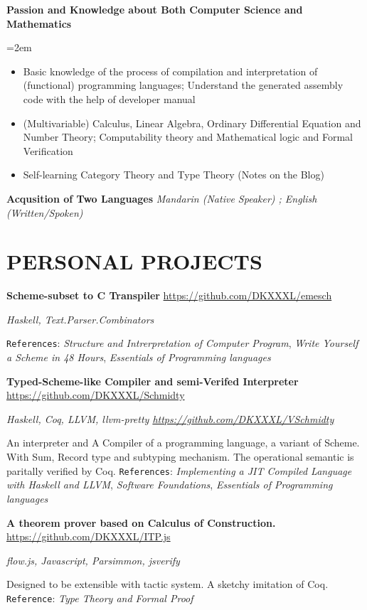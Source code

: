 \documentclass[fontsize=11pt]{article}
\newcommand{\NewPart}[1]{\section*{\uppercase{#1}}}
\newcommand{\SkillEntry}[2]{       %
    \noindent \textbf{#1} \hfill      %
        \noindent \textit{#2} \par        %
}
\newcommand{\SkillsEntry}[4]{       %
    \noindent \textbf{#1} \hfill      %
        \noindent \textit{#2} \par        %
    \noindent\hangindent=2em\hangafter=0 \small #4 %
    \normalsize \par}
\newcommand{\EducationEntry}[4]{
    \noindent \textbf{#1} \hfill      %
    \colorbox{Black}{ 
      \parbox{11em}{
      \centering \color{White}#2}} \par  %
    \noindent \textit{#3} \par        %
    \noindent\hangindent=0em\hangafter=0 \small #4 %
    \normalsize \par}
\newcommand{\ProjectEntry}[4]{         %
    \noindent \textbf{#1}  \hfill {#2} \par
    \noindent \textit{#3} \par
    \noindent \small #4 %
    \normalsize \par}
\begin{document}
\SkillsEntry{Passion and Knowledge about Both Computer Science and Mathematics}{}{}{
    \begin{itemize} \itemsep -1pt
        \item Basic knowledge of the process of compilation and interpretation of (functional) programming languages;
        Understand the generated assembly code with the help of developer manual
        \item (Multivariable) Calculus, Linear Algebra, Ordinary Differential Equation and Number Theory; 
        Computability theory and Mathematical logic and Formal Verification
        \item Self-learning Category Theory and Type Theory (Notes on the Blog)
    \end{itemize}
}

\SkillEntry{Acqusition of Two Languages}{
    Mandarin (Native Speaker) ; English (Written/Spoken)
}

\NewPart{Personal Projects}{}

\ProjectEntry{Scheme-subset to C Transpiler}{\url{https://github.com/DKXXXL/emesch}}
{Haskell, Text.Parser.Combinators}
{ \texttt{References}: \textit{Structure and Intrerpretation of Computer Program}, \textit{Write Yourself a Scheme in 48 Hours}, \textit{Essentials of Programming languages}}

\ProjectEntry{Typed-Scheme-like  Compiler and semi-Verifed Interpreter }{\url{https://github.com/DKXXXL/Schmidty}}
{Haskell, Coq, LLVM, llvm-pretty \hfill {\normalfont \url{https://github.com/DKXXXL/VSchmidty}}}
{An interpreter and A Compiler of a programming language, a variant of Scheme. With Sum, Record type and subtyping mechanism.  
The operational semantic is paritally verified by Coq. 
\texttt{References}: \textit{Implementing a JIT Compiled Language with Haskell and LLVM}, \textit{Software Foundations}, \textit{Essentials of Programming languages} }

\ProjectEntry{A theorem prover based on Calculus of Construction.}{\url{ https://github.com/DKXXXL/ITP.js}}
{flow.js, Javascript, Parsimmon, jsverify }
{Designed to be extensible with tactic system. 
A sketchy imitation of Coq. 
\texttt{Reference}: \textit{Type Theory and Formal Proof}
}



\ 
\end{document}
